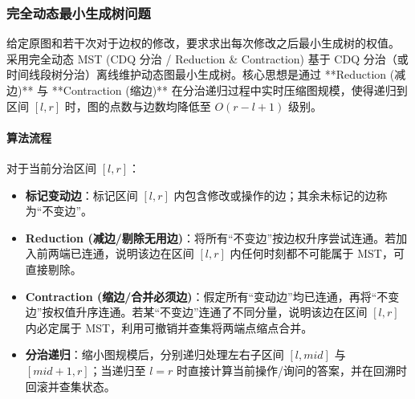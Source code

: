 \subsubsection{完全动态最小生成树问题}
\noindent
给定原图和若干次对于边权的修改，要求求出每次修改之后最小生成树的权值。
采用完全动态 MST (CDQ 分治 / Reduction \& Contraction)
基于 CDQ 分治（或时间线段树分治）离线维护动态图最小生成树。核心思想是通过 **Reduction (减边)** 与 **Contraction (缩边)** 在分治递归过程中实时压缩图规模，使得递归到区间 $[l, r]$ 时，图的点数与边数均降低至 $O(r - l + 1)$ 级别。

\paragraph{算法流程}
对于当前分治区间 $[l, r]$：
\begin{itemize}
	\setlength{\itemsep}{0pt}
	\setlength{\parskip}{0pt}
	\setlength{\parsep}{0pt}
	\item \textbf{标记变动边}：标记区间 $[l, r]$ 内包含修改或操作的边；其余未标记的边称为“不变边”。
	\item \textbf{Reduction (减边/剔除无用边)}：将所有“不变边”按边权升序尝试连通。若加入前两端已连通，说明该边在区间 $[l, r]$ 内任何时刻都不可能属于 MST，可直接剔除。
	\item \textbf{Contraction (缩边/合并必须边)}：假定所有“变动边”均已连通，再将“不变边”按权值升序连通。若某“不变边”连通了不同分量，说明该边在区间 $[l, r]$ 内必定属于 MST，利用可撤销并查集将两端点缩点合并。
	\item \textbf{分治递归}：缩小图规模后，分别递归处理左右子区间 $[l, mid]$ 与 $[mid+1, r]$；当递归至 $l = r$ 时直接计算当前操作/询问的答案，并在回溯时回滚并查集状态。
\end{itemize}

